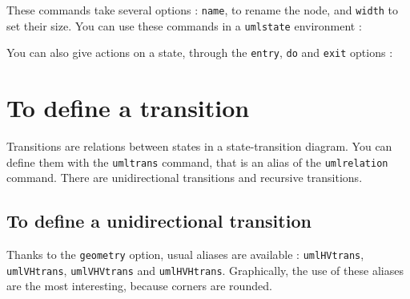 \documentclass[a4paper,11pt]{report}
\newcommand{\inputTikZ}[1]{%
  }%
\newcommand{\inputTikZ}[1]{%
    \texttt{[image: fig/\#1.pdf]}%
  }%
\begin{document}
\medskip

These commands take several options : {\tt name}, to rename the node, and {\tt width} to set their size. You can use these commands in a {\tt umlstate} environment :

\medskip

\begin{minipage}{0.51\textwidth}

\end{minipage}
\begin{minipage}{0.49\textwidth}
\begin{center}
\inputTikZ{statename}
\end{center}
\end{minipage}

\medskip

You can also give actions on a state, through the {\tt entry}, {\tt do} and {\tt exit} options :

\medskip

\begin{minipage}{0.51\textwidth}

\end{minipage}
\begin{minipage}{0.49\textwidth}
\begin{center}
\inputTikZ{stateactions}
\end{center}
\end{minipage}

\section{To define a transition}\label{s.trans}

Transitions are relations between states in a state-transition diagram. You can define them with the {\tt umltrans} command, that is an alias of the {\tt umlrelation} command. There are unidirectional transitions and recursive transitions.

\subsection{To define a unidirectional transition}\label{s.unitrans}

Thanks to the {\tt geometry} option, usual aliases are available : {\tt umlHVtrans}, {\tt umlVHtrans}, {\tt umlVHVtrans} and {\tt umlHVHtrans}. Graphically, the use of these aliases are the most interesting, because corners are rounded.

\medskip
\end{document}
